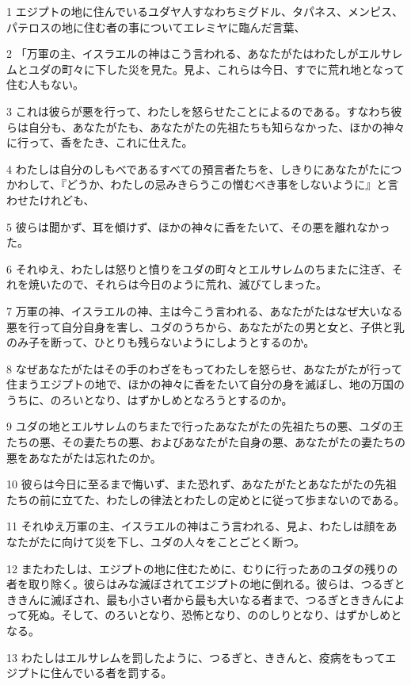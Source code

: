 \par 1 エジプトの地に住んでいるユダヤ人すなわちミグドル、タパネス、メンピス、パテロスの地に住む者の事についてエレミヤに臨んだ言葉、
\par 2 「万軍の主、イスラエルの神はこう言われる、あなたがたはわたしがエルサレムとユダの町々に下した災を見た。見よ、これらは今日、すでに荒れ地となって住む人もない。
\par 3 これは彼らが悪を行って、わたしを怒らせたことによるのである。すなわち彼らは自分も、あなたがたも、あなたがたの先祖たちも知らなかった、ほかの神々に行って、香をたき、これに仕えた。
\par 4 わたしは自分のしもべであるすべての預言者たちを、しきりにあなたがたにつかわして、『どうか、わたしの忌みきらうこの憎むべき事をしないように』と言わせたけれども、
\par 5 彼らは聞かず、耳を傾けず、ほかの神々に香をたいて、その悪を離れなかった。
\par 6 それゆえ、わたしは怒りと憤りをユダの町々とエルサレムのちまたに注ぎ、それを焼いたので、それらは今日のように荒れ、滅びてしまった。
\par 7 万軍の神、イスラエルの神、主は今こう言われる、あなたがたはなぜ大いなる悪を行って自分自身を害し、ユダのうちから、あなたがたの男と女と、子供と乳のみ子を断って、ひとりも残らないようにしようとするのか。
\par 8 なぜあなたがたはその手のわざをもってわたしを怒らせ、あなたがたが行って住まうエジプトの地で、ほかの神々に香をたいて自分の身を滅ぼし、地の万国のうちに、のろいとなり、はずかしめとなろうとするのか。
\par 9 ユダの地とエルサレムのちまたで行ったあなたがたの先祖たちの悪、ユダの王たちの悪、その妻たちの悪、およびあなたがた自身の悪、あなたがたの妻たちの悪をあなたがたは忘れたのか。
\par 10 彼らは今日に至るまで悔いず、また恐れず、あなたがたとあなたがたの先祖たちの前に立てた、わたしの律法とわたしの定めとに従って歩まないのである。
\par 11 それゆえ万軍の主、イスラエルの神はこう言われる、見よ、わたしは顔をあなたがたに向けて災を下し、ユダの人々をことごとく断つ。
\par 12 またわたしは、エジプトの地に住むために、むりに行ったあのユダの残りの者を取り除く。彼らはみな滅ぼされてエジプトの地に倒れる。彼らは、つるぎとききんに滅ぼされ、最も小さい者から最も大いなる者まで、つるぎとききんによって死ぬ。そして、のろいとなり、恐怖となり、ののしりとなり、はずかしめとなる。
\par 13 わたしはエルサレムを罰したように、つるぎと、ききんと、疫病をもってエジプトに住んでいる者を罰する。
